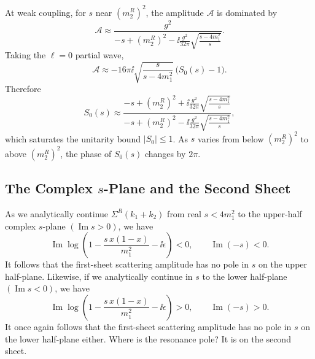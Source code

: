 At weak coupling, for \(s\) near \(\left(m_2^R\right)^2\), the amplitude
\(\mathcal A\) is dominated by
\[
  \mathcal A
  \approx
  \frac{g^2}{
    -s+\left(m_2^R\right)^2
    -\ii\frac{g^2}{32\pi}\sqrt{\frac{s-4m_1^2}{s}}
  }.
\]
Taking the \(\ell=0\) partial wave,
\[
  \mathcal A
  \approx
  -16\pi\ii\sqrt{\frac{s}{s-4m_1^2}}\,
  \bigl(S_0(s)-1\bigr).
\]
Therefore
\[
  S_0(s)
  \approx
  \frac{
    -s+\left(m_2^R\right)^2
    +\ii\frac{g^2}{32\pi}\sqrt{\frac{s-4m_1^2}{s}}
  }{
    -s+\left(m_2^R\right)^2
    -\ii\frac{g^2}{32\pi}\sqrt{\frac{s-4m_1^2}{s}}
  },
\]
which saturates the unitarity bound \(|S_0|\leq1\).  As \(s\) varies
from below \(\left(m_2^R\right)^2\) to above \(\left(m_2^R\right)^2\),
the phase of \(S_0(s)\) changes by \(2\pi\).

\begin{center}
\end{center}

\subsection{The Complex \texorpdfstring{\(s\)}{s}-Plane and the Second Sheet}

As we analytically continue \(\Sigma^R(k_1+k_2)\) from real
\(s<4m_1^2\) to the upper-half complex \(s\)-plane
\((\operatorname{Im}s>0)\), we have
\[
  \operatorname{Im}
  \log\left(1-\frac{s\,x(1-x)}{m_1^2}-\ii\epsilon\right)<0,
  \qquad
  \operatorname{Im}(-s)<0.
\]
It follows that the first-sheet scattering amplitude has no pole in
\(s\) on the upper half-plane.  Likewise, if we analytically continue in
\(s\) to the lower half-plane \((\operatorname{Im}s<0)\), we have
\[
  \operatorname{Im}
  \log\left(1-\frac{s\,x(1-x)}{m_1^2}-\ii\epsilon\right)>0,
  \qquad
  \operatorname{Im}(-s)>0.
\]
It once again follows that the first-sheet scattering amplitude has no
pole in \(s\) on the lower half-plane either.  Where is the resonance
pole?  It is on the second sheet.

